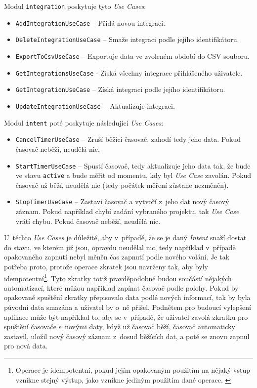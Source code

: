 Modul \texttt{integration} poskytuje tyto \emph{Use Cases}:
\begin{itemize}
\item\texttt{AddIntegrationUseCase} – Přidá novou integraci.
\item\texttt{DeleteIntegrationUseCase} – Smaže integraci podle jejího identifikátoru.
\item\texttt{ExportToCsvUseCase} – Exportuje data ve zvoleném období do CSV souboru.
\item\texttt{GetIntegrationsUseCase} - Získá všechny integrace přihlášeného uživatele.
\item\texttt{GetIntegrationUseCase} – Získá integraci podle jejího identifikátoru.
\item\texttt{UpdateIntegrationUseCase} – Aktualizuje integraci.
\end{itemize}
Modul \texttt{intent} poté poskytuje následující \emph{Use Cases}:
\begin{itemize}
\item\texttt{CancelTimerUseCase} – Zruší běžící časovač, zahodí tedy jeho data. Pokud časovač neběží, neudělá nic.
\item\texttt{StartTimerUseCase} – Spustí časovač, tedy aktualizuje jeho data tak, že bude ve stavu \texttt{active} a bude měřit od momentu, kdy byl \emph{Use Case} zavolán. Pokud časovač už běží, neudělá nic (tedy počátek měření zůstane nezměněn).
\item\texttt{StopTimerUseCase} – Zastaví časovač a vytvoří z~jeho dat nový časový záznam. Pokud například chybí zadání vybraného projektu, tak \emph{Use Case} vrátí chybu. Pokud časovač neběží, neudělá nic.
\end{itemize}
U~těchto \emph{Use Cases} je důležité, aby v~případě, že se je daný \emph{Intent} snaží dostat do stavu, ve kterém již jsou, opravdu neudělal nic, tedy například v~případě opakovaného zapnutí nebyl měněn čas zapnutí podle nového volání. Je tak potřeba proto, protože operace zkratek jsou navrženy tak, aby byly idempotentní\footnote{Operace je idempotentní, pokud jejím opakovaným použitím na nějaký vstup vznikne stejný výstup, jako vznikne jediným použitím dané operace. \cite{idempotence}}. Tyto zkratky totiž pravděpodobně budou součástí nějakých automatizací, které můžou například zapínat časovač podle polohy. Pokud by opakované spuštění zkratky přepisovalo data podlé nových informací, tak by byla původní data smazána a uživatel by o~ně přišel. Podnětem pro budoucí vylepšení aplikace může být například to, aby se v~případě, že uživatel zavolá zkratku pro spuštění časovače s~novými daty, když už časovač běží, časovač automaticky zastavil, uložil nový časový záznam z~dosud běžících dat, a poté se znovu zapnul pro nová data.


